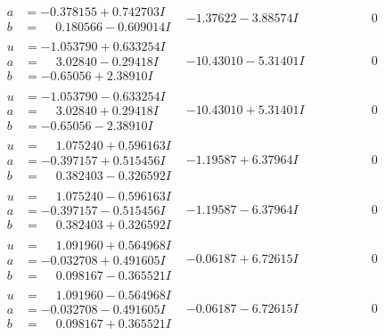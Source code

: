 \documentclass[1p]{elsarticle_modified}
\theoremstyle{definition}
\begin{document}
$$\begin{array}{c|c|c}
\begin{aligned}
a &= -0.378155 + 0.742703 I \\
b &= \phantom{-}0.180566 - 0.609014 I\end{aligned}
 & -1.37622 - 3.88574 I & \phantom{-0.000000 } 0 \\ \hline\begin{aligned}
u &= -1.053790 + 0.633254 I \\
a &= \phantom{-}3.02840 - 0.29418 I \\
b &= -0.65056 + 2.38910 I\end{aligned}
 & -10.43010 - 5.31401 I & \phantom{-0.000000 } 0 \\ \hline\begin{aligned}
u &= -1.053790 - 0.633254 I \\
a &= \phantom{-}3.02840 + 0.29418 I \\
b &= -0.65056 - 2.38910 I\end{aligned}
 & -10.43010 + 5.31401 I & \phantom{-0.000000 } 0 \\ \hline\begin{aligned}
u &= \phantom{-}1.075240 + 0.596163 I \\
a &= -0.397157 + 0.515456 I \\
b &= \phantom{-}0.382403 - 0.326592 I\end{aligned}
 & -1.19587 + 6.37964 I & \phantom{-0.000000 } 0 \\ \hline\begin{aligned}
u &= \phantom{-}1.075240 - 0.596163 I \\
a &= -0.397157 - 0.515456 I \\
b &= \phantom{-}0.382403 + 0.326592 I\end{aligned}
 & -1.19587 - 6.37964 I & \phantom{-0.000000 } 0 \\ \hline\begin{aligned}
u &= \phantom{-}1.091960 + 0.564968 I \\
a &= -0.032708 + 0.491605 I \\
b &= \phantom{-}0.098167 - 0.365521 I\end{aligned}
 & -0.06187 + 6.72615 I & \phantom{-0.000000 } 0 \\ \hline\begin{aligned}
u &= \phantom{-}1.091960 - 0.564968 I \\
a &= -0.032708 - 0.491605 I \\
b &= \phantom{-}0.098167 + 0.365521 I\end{aligned}
 & -0.06187 - 6.72615 I & \phantom{-0.000000 } 0 \\ \hline\begin{aligned}

\end{aligned}
\end{array}$$
\end{document}
